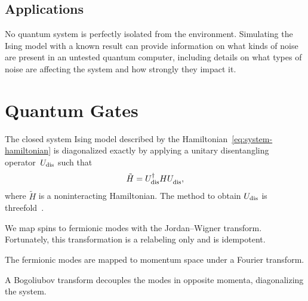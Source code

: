 \documentclass[12pt, twocolumn]{article}
\begin{document}
  \subsection*{Applications}
  No quantum system is perfectly isolated from the environment. Simulating the Ising model with a known result can provide information on what kinds of noise are present in an untested quantum computer, including details on what types of noise are affecting the system and how strongly they impact it.

  \section{Quantum Gates}
  The closed system Ising model described by the Hamiltonian~\eqref{eq:system-hamiltonian} is diagonalized exactly by applying a unitary disentangling operator~\( U_{\textnormal{dis}} \) such that
  \begin{equation}
    \tilde{H}
      = U_{\textnormal{dis}}^{\dagger} H
        U_{\textnormal{dis}}^{\vphantom{\dagger}},
  \end{equation}
  where \( \tilde{H} \) is a noninteracting Hamiltonian. The method to obtain \( U_{\textnormal{dis}} \) is threefold~\cite{Verstraete2009}.
  \begin{enumerate*}[label=(\arabic*)]
    \item We map spins to fermionic modes with the Jordan--Wigner transform. Fortunately, this transformation is a relabeling only and is idempotent.
    \item The fermionic modes are mapped to momentum space under a Fourier transform.
    \item A Bogoliubov transform decouples the modes in opposite momenta, diagonalizing the system.
  \end{enumerate*}
\end{document}

